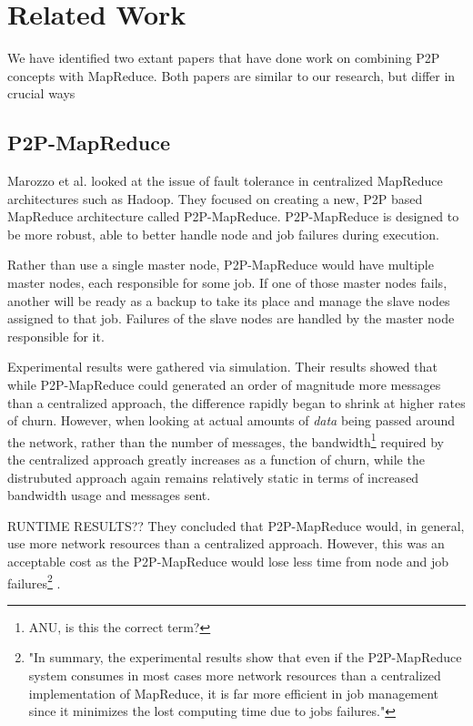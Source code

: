 \documentclass[conference, compsocconf, letterpaper]{IEEEtran}
\begin{document}
\section{Related Work}

We have identified two extant papers that have done work on combining P2P concepts with MapReduce.  Both papers are similar to our research, but differ in crucial ways

\subsection{P2P-MapReduce}
Marozzo et al. \cite{marozzo2012p2p} looked at the issue of fault tolerance in centralized MapReduce architectures such as Hadoop.  They focused on creating a new, P2P based MapReduce architecture called P2P-MapReduce.  P2P-MapReduce is designed to be more robust, able to better handle node and job failures during execution.

Rather than use a single master node, P2P-MapReduce would have multiple master nodes, each responsible for some job.  If one of those master nodes fails, another will be ready as a backup to take its place and manage the slave nodes assigned to that job.  Failures of the slave nodes are handled by the master node responsible for it.

Experimental results were gathered via simulation. Their results showed that while P2P-MapReduce could generated an order of magnitude more messages than a centralized approach, the difference rapidly began to shrink at higher rates of churn.  However, when looking at actual amounts of \emph{data} being passed around the network, rather than the number of messages, the bandwidth\footnote{ANU, is this the correct term?} required by the centralized approach greatly increases as a function of churn, while the distrubuted approach again remains relatively static in terms of increased bandwidth usage and messages sent.  

RUNTIME RESULTS?? They concluded that P2P-MapReduce would, in general, use more network resources than a centralized approach. However, this was an acceptable cost as the P2P-MapReduce would lose less time from node and job failures\footnote{"In summary, the experimental results show that even if the P2P-MapReduce system consumes in most cases more network resources than a centralized implementation of MapReduce, it is far more efficient in job management since it minimizes the lost computing time due to jobs failures."\cite{marozzo2012p2p}} \cite{marozzo2012p2p}.
\end{document}
